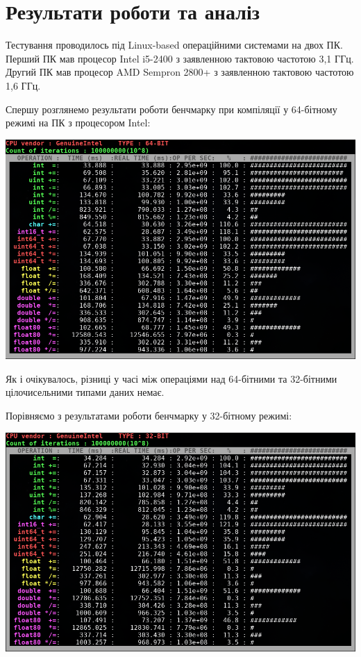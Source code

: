 \section{Результати роботи та аналіз}

Тестування проводилось під Linux-based операційними системами на двох ПК. Перший ПК мав процесор Intel i5-2400 з заявленною тактовою частотою 3,1 ГГц. Другий ПК мав процесор AMD Sempron 2800+ з заявленною тактовою частотою 1,6 ГГц. 

Спершу розглянемо результати роботи бенчмарку при компіляції у 64-бітному режимі на ПК з процесором Intel:

\includegraphics[width = 16cm]{img/intel64.png}

Як і очікувалось, різниці у часі між операціями над 64-бітними та 32-бітними цілочисельними типами даних немає.

Порівняємо з результатами роботи бенчмарку у 32-бітному режимі:

\includegraphics[width = 16cm]{img/intel32.png}

